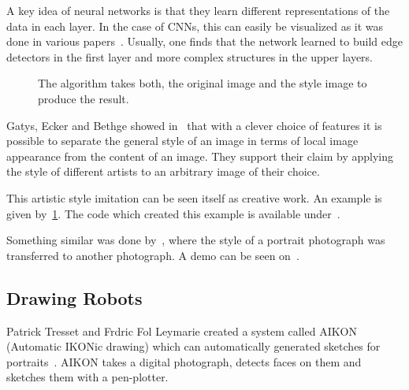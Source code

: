 \documentclass[technote,a4paper,leqno]{IEEEtran}
\begin{document}
A key idea of neural networks is that they learn different representations of
the data in each layer. In the case of \glspl{CNN}, this can easily be
visualized as it was done in various papers~\cite{zeiler2014visualizing}.
Usually, one finds that the network learned to build edge detectors in the
first layer and more complex structures in the upper layers.

\begin{figure}
\centering
{}%

\caption{The algorithm takes both, the original image and the style image  to produce the result.}
\label{fig:neural-style}
\end{figure}

Gatys, Ecker and Bethge showed in~\cite{gatys2015neural} that with a clever
choice of features it is possible to separate the general style of an image in
terms of local image appearance from the content of an image. They support
their claim by applying the style of different artists to an arbitrary image of
their choice.

This artistic style imitation can be seen itself as creative work. An example
is given by~\cref{fig:neural-style}. The code which created this example is
available under~\cite{Johnson2016}.

Something similar was done by~\cite{shih2014style}, where the style of a
portrait photograph was transferred to another photograph. A demo can be seen
on~\cite{Shih2014}.

\subsection{Drawing Robots}
Patrick Tresset and Frdric Fol Leymarie created a system called AIKON
(Automatic IKONic drawing) which can automatically generated sketches for
portraits~\cite{tresset2005generative}. AIKON takes a digital photograph,
detects faces on them and sketches them with a pen-plotter.
\end{document}
